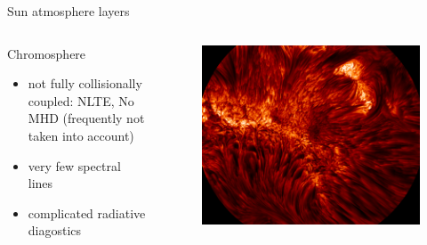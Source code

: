\documentclass{beamer}
\begin{document}
\begin{frame}[t]{Sun atmosphere layers}
\begin{columns}[b]
    \begin{column}{0.6\textwidth}
		Chromosphere
        \begin{itemize}
					\item not fully collisionally coupled: NLTE, No MHD (frequently not taken into account)
					\item very few spectral lines 
					\item complicated radiative diagostics 
        \end{itemize}
    \end{column}
    \begin{column}{0.5\textwidth}
			\begin{figure}[t]
			 \centering
			 \includegraphics[scale=0.03]{chrom.png}
			\end{figure}
    \end{column}
\end{columns}


\end{frame}
\end{document}

